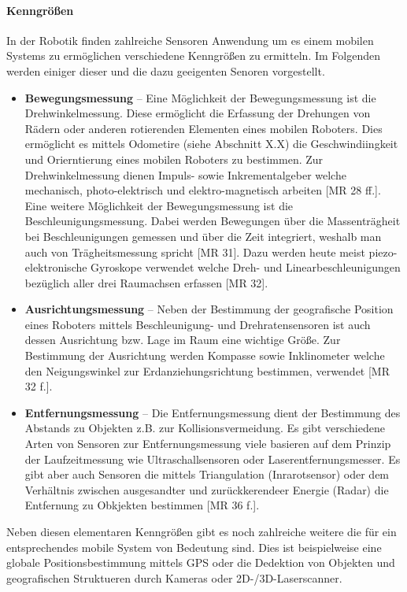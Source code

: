 \paragraph{Kenngrößen}
\color{finishing}
In der Robotik finden zahlreiche Sensoren Anwendung um es einem mobilen Systems zu ermöglichen
verschiedene Kenngrößen zu ermitteln. Im Folgenden werden einiger dieser und die dazu geeigenten Senoren vorgestellt.
\begin{itemize}
	\item{\textbf{Bewegungsmessung}} -- Eine Möglichkeit der Bewegungsmessung ist die Drehwinkelmessung. Diese ermöglicht die Erfassung der Drehungen von Rädern oder 
	anderen rotierenden Elementen eines mobilen Roboters. Dies ermöglicht es mittels Odometire (siehe Abschnitt X.X) die Geschwindiingkeit und Orierntierung eines mobilen Roboters zu bestimmen. Zur Drehwinkelmessung dienen Impuls- sowie Inkrementalgeber welche mechanisch, photo-elektrisch und elektro-magnetisch arbeiten [MR 28 ff.].
	\newline
	Eine weitere Möglichkeit der Bewegungsmessung ist die Beschleunigungsmessung. Dabei werden Bewegungen über die Massenträgheit bei Beschleunigungen gemessen und über die Zeit integriert, weshalb man auch von Trägheitsmessung spricht [MR 31]. Dazu werden heute meist
	piezo-elektronische Gyroskope verwendet welche Dreh- und Linearbeschleunigungen bezüglich aller drei Raumachsen erfassen [MR 32].
	\item{\textbf{Ausrichtungsmessung}} -- Neben der Bestimmung der geografische Position eines Roboters mittels Beschleunigung- und Drehratensensoren ist auch dessen Ausrichtung bzw. Lage im Raum eine wichtige Größe. Zur Bestimmung der Ausrichtung werden Kompasse sowie Inklinometer welche den Neigungswinkel zur Erdanziehungsrichtung bestimmen, verwendet [MR 32 f.].
	\item{\textbf{Entfernungsmessung}} -- Die Entfernungsmessung dient der Bestimmung des Abstands zu Objekten z.B. zur Kollisionsvermeidung. 
	\newline
	Es gibt verschiedene Arten von Sensoren zur Entfernungsmessung viele basieren auf dem Prinzip der Laufzeitmessung wie Ultraschallsensoren oder Laserentfernungsmesser. Es gibt aber auch Sensoren die mittels Triangulation (Inrarotsensor) oder dem Verhältnis zwischen ausgesandter und zurückkerendeer Energie (Radar) die Entfernung zu Obkjekten bestimmen [MR 36 f.]. 
\end{itemize}
Neben diesen elementaren Kenngrößen gibt es noch zahlreiche weitere die für ein entsprechendes
mobile System von Bedeutung sind. Dies ist beispielweise eine globale Positionsbestimmung 
mittels GPS oder die Dedektion von Objekten und geografischen Struktueren durch Kameras oder 2D-/3D-Laserscanner.
